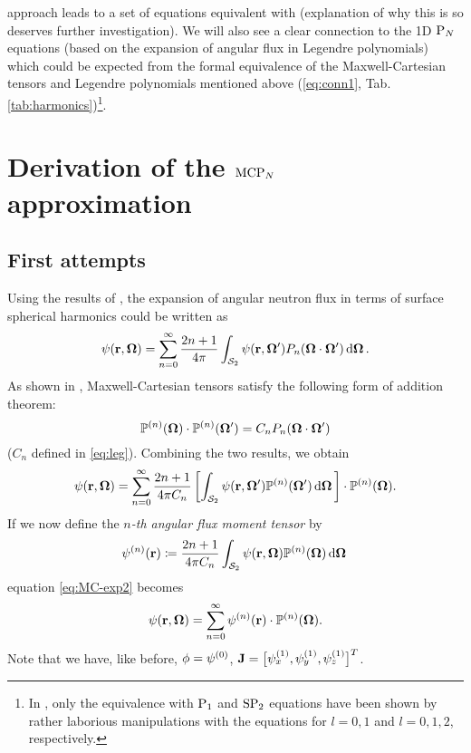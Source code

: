 approach leads to a set of equations equivalent with \cite[Eqn. (42)]{Coppa3} (explanation of why this is so deserves 
further investigation). We will also see a clear connection to the 1D $\PN$ equations (based on the expansion of angular 
flux in Legendre polynomials) which could be expected from the formal equivalence of the Maxwell-Cartesian tensors and 
Legendre polynomials mentioned above (\eqref{eq:conn1}, 
Tab. \ref{tab:harmonics})\footnote{In \cite{Coppa3}, only the equivalence with $\PN[1]$ and $\SPN[2]$ equations have 
been shown by rather laborious manipulations with the equations for $l = 0,1$ and $l = 0,1,2$, respectively.}.

\section{Derivation of the $\MCPN$ approximation}\label{sec:mcpn}
\subsection{First attempts}
Using the results of \cite[Art. 114]{Byerly}, the expansion of angular neutron flux in terms of surface spherical 
harmonics could be written as
\begin{equation}\label{eq:MC-exp1}
  \psi(\br,\bomega) = \suma[n]{0}{\infty}\frac{2n+1}{4\pi}\intA{\psi(\br,\bomega')P_n(\bomega\cdot\bomega')}.
\end{equation}
As shown in \cite[Sec. 7, Corollary II]{Applequist1}, Maxwell-Cartesian tensors satisfy the following form of 
addition theorem:
\begin{equation}\label{eq:MC-addition}
  \PP(\bomega)\contr\PP(\bomega') = C_n P_n(\bomega\cdot\bomega')
\end{equation}
($C_n$ defined in \eqref{eq:leg}). Combining the two results, we obtain
\begin{equation}\label{eq:MC-exp2}
  \psi(\br,\bomega) = \suma[n]{0}{\infty}\frac{2n+1}{4\pi C_n}\left[\intA{\psi(\br,\bomega')\PP(\bomega')}\right]\contr\PP(\bomega).
\end{equation}
If we now define the \textit{$n$-th angular flux moment tensor} by
\begin{equation}\label{eq:flux-moment}
  \fmom(\br) \coloneqq \frac{2n+1}{4\pi C_n}\intA{\psi(\br,\bomega)\PP(\bomega)}
\end{equation}
equation \eqref{eq:MC-exp2} becomes
\begin{equation}\label{eq:MC-exp3}
  \psi(\br,\bomega) = \suma[n]{0}{\infty}\fmom(\br)\contr\PP(\bomega).
\end{equation}
Note that we have, like before, $\phi = \fmom[0]$, $\mathbf{J} = \bigl[\fmom[1]_x,\fmom[1]_y,\fmom[1]_z\bigr]^T$.

